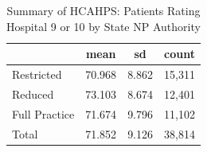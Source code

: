 \begin{table}[htbp]\centering
\def\sym#1{\ifmmode^{#1}\else\(^{#1}\)\fi}
\caption{Summary of HCAHPS: Patients Rating Hospital 9 or 10 by State NP Authority}
\begin{tabular}{l*{1}{ccc}}
\toprule
                    &        mean&          sd&       count\\
\midrule
Restricted          &      70.968&       8.862&      15,311\\
Reduced             &      73.103&       8.674&      12,401\\
Full Practice       &      71.674&       9.796&      11,102\\
Total               &      71.852&       9.126&      38,814\\
\bottomrule
\end{tabular}
\end{table}
